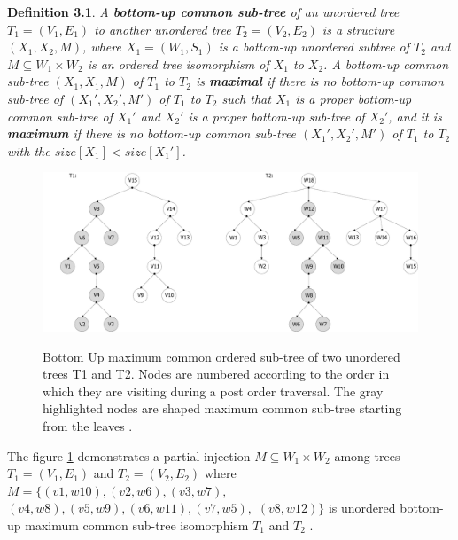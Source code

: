 \documentclass{report}
\begin{document}
\textbf{Definition 3.1}. \emph{
A \textbf{bottom-up common sub-tree} of an unordered tree $ T_{1} = ( V_{1}, E_{1})$ to another unordered tree $ T_{2} = ( V_{2}, E_{2})$ is a structure 
$ (X_{1}, X_{2}, M)$, where $ X_{1} = (W_{1}, S_{1})$ is a bottom-up unordered subtree of $ T_{2}$ and $M \subseteq W_{1} \times  W_{2}$ is an ordered tree isomorphism of $ X_{1}$ to $ X_{2}$. A bottom-up common sub-tree $ (X_{1}, X_{1}, M)$ of $ T_{1}$ to $ T_{2}$ is \textbf{maximal} if there is no bottom-up common sub-tree of $ (X_{1}', X_{2}', M')$ of $ T_{1}$ to $ T_{2}$ such that $ X_{1}$  is a proper bottom-up common sub-tree of $ X_{1}'$ and $ X_{2}'$ is a proper bottom-up sub-tree of $ X_{2}'$, and it is \textbf{maximum} if there is no bottom-up common sub-tree $ (X_{1}', X_{2}', M')$  of $ T_{1}$ to $ T_{2}$ with the $size[X_{1}] < size[X_{1}']$\cite{valiente}.
}

\begin{figure}[th]
  \centering
  \includegraphics[scale=0.45]{Figures/algorithms/BU/bottom-up-max-common-example.pdf}\\[0.1cm]
  \caption[Bottom up maximum common sub-tree of two unordered trees]{Bottom Up maximum common ordered sub-tree of two unordered trees T1 and T2. Nodes are numbered according to the order in which they are visiting during a post order traversal. The gray highlighted nodes are shaped maximum common sub-tree starting from the leaves \cite{valiente}.}
  \label{fig:bottom-up-max-common-example}
\end{figure}

The figure \ref{fig:bottom-up-max-common-example} demonstrates a partial injection $M \subseteq W_{1} \times  W_{2}$ among trees $ T_{1} = ( V_{1}, E_{1})$ and  $ T_{2} = ( V_{2}, E_{2})$ where $M  = \{ (v1,w10),  (v2,w6), (v3,w7), $ \\
$(v4,w8),  (v5,w9),  (v6,w11),  (v7,w5), $  $ (v8,w12)\}$ is unordered bottom-up maximum common sub-tree isomorphism $ T_{1}$ and $ T_{2 }$ \cite{valiente}.
\end{document}
